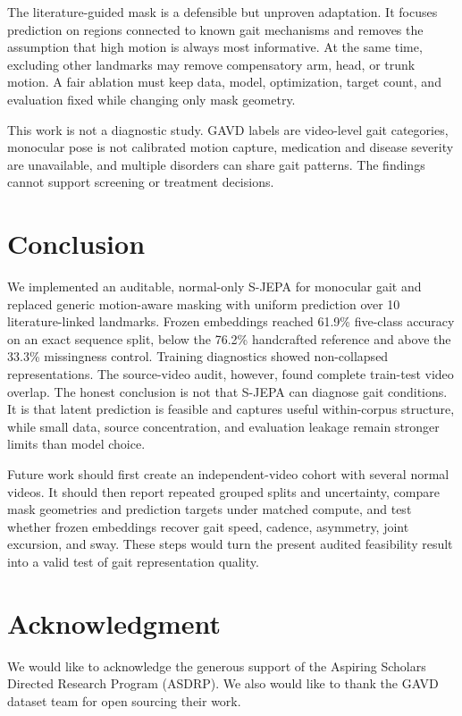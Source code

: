\documentclass[conference]{IEEEtran}
\begin{document}
The literature-guided mask is a defensible but unproven adaptation. It focuses prediction on regions connected to known gait mechanisms and removes the assumption that high motion is always most informative. At the same time, excluding other landmarks may remove compensatory arm, head, or trunk motion. A fair ablation must keep data, model, optimization, target count, and evaluation fixed while changing only mask geometry.

This work is not a diagnostic study. GAVD labels are video-level gait categories, monocular pose is not calibrated motion capture, medication and disease severity are unavailable, and multiple disorders can share gait patterns. The findings cannot support screening or treatment decisions.

\section{Conclusion}
We implemented an auditable, normal-only S-JEPA for monocular gait and replaced generic motion-aware masking with uniform prediction over 10 literature-linked landmarks. Frozen embeddings reached 61.9\% five-class accuracy on an exact sequence split, below the 76.2\% handcrafted reference and above the 33.3\% missingness control. Training diagnostics showed non-collapsed representations. The source-video audit, however, found complete train-test video overlap. The honest conclusion is not that S-JEPA can diagnose gait conditions. It is that latent prediction is feasible and captures useful within-corpus structure, while small data, source concentration, and evaluation leakage remain stronger limits than model choice.

Future work should first create an independent-video cohort with several normal videos. It should then report repeated grouped splits and uncertainty, compare mask geometries and prediction targets under matched compute, and test whether frozen embeddings recover gait speed, cadence, asymmetry, joint excursion, and sway. These steps would turn the present audited feasibility result into a valid test of gait representation quality.

\section*{Acknowledgment}
We would like to acknowledge the generous support of the Aspiring Scholars Directed Research Program (ASDRP). We also would like to thank the GAVD dataset team for open sourcing their work.



\end{document}
